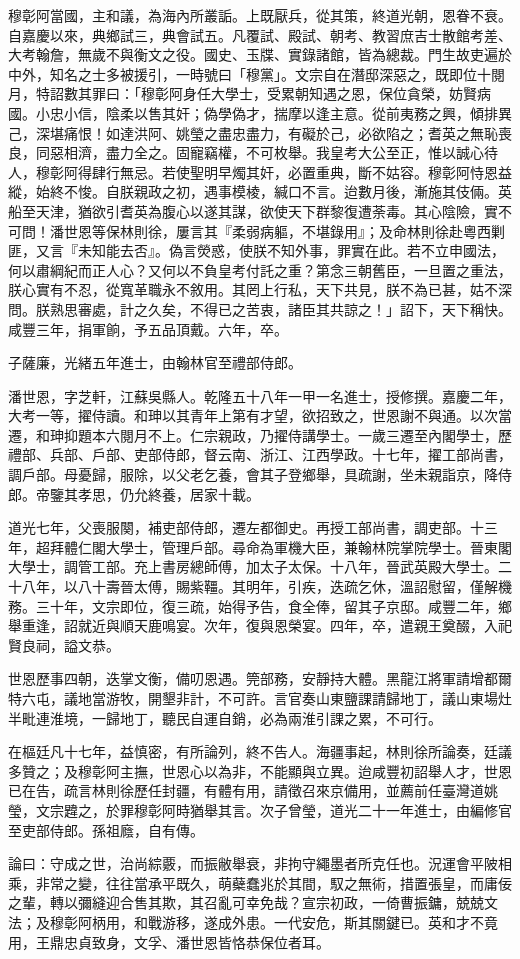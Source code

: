 \begin{pinyinscope}
穆彰阿當國，主和議，為海內所叢詬。上既厭兵，從其策，終道光朝，恩眷不衰。自嘉慶以來，典鄉試三，典會試五。凡覆試、殿試、朝考、教習庶吉士散館考差、大考翰詹，無歲不與衡文之役。國史、玉牒、實錄諸館，皆為總裁。門生故吏遍於中外，知名之士多被援引，一時號曰「穆黨」。文宗自在潛邸深惡之，既即位十閱月，特詔數其罪曰：「穆彰阿身任大學士，受累朝知遇之恩，保位貪榮，妨賢病國。小忠小信，陰柔以售其奸；偽學偽才，揣摩以逢主意。從前夷務之興，傾排異己，深堪痛恨！如達洪阿、姚瑩之盡忠盡力，有礙於己，必欲陷之；耆英之無恥喪良，同惡相濟，盡力全之。固寵竊權，不可枚舉。我皇考大公至正，惟以誠心待人，穆彰阿得肆行無忌。若使聖明早燭其奸，必置重典，斷不姑容。穆彰阿恃恩益縱，始終不悛。自朕親政之初，遇事模棱，緘口不言。迨數月後，漸施其伎倆。英船至天津，猶欲引耆英為腹心以遂其謀，欲使天下群黎復遭荼毒。其心陰險，實不可問！潘世恩等保林則徐，屢言其『柔弱病軀，不堪錄用』；及命林則徐赴粵西剿匪，又言『未知能去否』。偽言熒惑，使朕不知外事，罪實在此。若不立申國法，何以肅綱紀而正人心？又何以不負皇考付託之重？第念三朝舊臣，一旦置之重法，朕心實有不忍，從寬革職永不敘用。其罔上行私，天下共見，朕不為已甚，姑不深問。朕熟思審處，計之久矣，不得已之苦衷，諸臣其共諒之！」詔下，天下稱快。咸豐三年，捐軍餉，予五品頂戴。六年，卒。

子薩廉，光緒五年進士，由翰林官至禮部侍郎。

潘世恩，字芝軒，江蘇吳縣人。乾隆五十八年一甲一名進士，授修撰。嘉慶二年，大考一等，擢侍讀。和珅以其青年上第有才望，欲招致之，世恩謝不與通。以次當遷，和珅抑題本六閱月不上。仁宗親政，乃擢侍講學士。一歲三遷至內閣學士，歷禮部、兵部、戶部、吏部侍郎，督云南、浙江、江西學政。十七年，擢工部尚書，調戶部。母憂歸，服除，以父老乞養，會其子登鄉舉，具疏謝，坐未親詣京，降侍郎。帝鑒其孝思，仍允終養，居家十載。

道光七年，父喪服闋，補吏部侍郎，遷左都御史。再授工部尚書，調吏部。十三年，超拜體仁閣大學士，管理戶部。尋命為軍機大臣，兼翰林院掌院學士。晉東閣大學士，調管工部。充上書房總師傅，加太子太保。十八年，晉武英殿大學士。二十八年，以八十壽晉太傅，賜紫韁。其明年，引疾，迭疏乞休，溫詔慰留，僅解機務。三十年，文宗即位，復三疏，始得予告，食全俸，留其子京邸。咸豐二年，鄉舉重逢，詔就近與順天鹿鳴宴。次年，復與恩榮宴。四年，卒，遣親王奠醊，入祀賢良祠，謚文恭。

世恩歷事四朝，迭掌文衡，備叨恩遇。筦部務，安靜持大體。黑龍江將軍請增都爾特六屯，議地當游牧，開墾非計，不可許。言官奏山東鹽課請歸地丁，議山東場灶半毗連淮境，一歸地丁，聽民自運自銷，必為兩淮引課之累，不可行。

在樞廷凡十七年，益慎密，有所論列，終不告人。海疆事起，林則徐所論奏，廷議多贊之；及穆彰阿主撫，世恩心以為非，不能顯與立異。迨咸豐初詔舉人才，世恩已在告，疏言林則徐歷任封疆，有體有用，請徵召來京備用，並薦前任臺灣道姚瑩，文宗韙之，於罪穆彰阿時猶舉其言。次子曾瑩，道光二十一年進士，由編修官至吏部侍郎。孫祖廕，自有傳。

論曰：守成之世，治尚綜覈，而振敝舉衰，非拘守繩墨者所克任也。況運會平陂相乘，非常之變，往往當承平既久，萌蘗蠢兆於其間，馭之無術，措置張皇，而庸佞之輩，轉以彌縫迎合售其欺，其召亂可幸免哉？宣宗初政，一倚曹振鏞，兢兢文法；及穆彰阿柄用，和戰游移，遂成外患。一代安危，斯其關鍵已。英和才不竟用，王鼎忠貞致身，文孚、潘世恩皆恪恭保位者耳。


\end{pinyinscope}